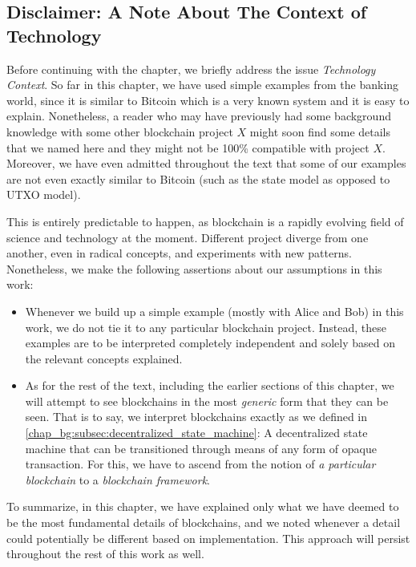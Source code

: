 \subsection{Disclaimer: A Note About The Context of Technology}

Before continuing with the chapter, we briefly address the issue \textit{Technology Context}. So far
in this chapter, we have used simple examples from the banking world, since it is similar to Bitcoin
which is a very known system and it is easy to explain. Nonetheless, a reader who may have
previously had some background knowledge with some other blockchain project $X$ might soon find some
details that we named here and they might not be 100\% compatible with project $X$. Moreover, we
have even admitted throughout the text that some of our examples are not even exactly similar to
Bitcoin (such as the state model as opposed to UTXO model).

This is entirely predictable to happen, as blockchain is a rapidly evolving field of
science and technology at the moment. Different project diverge from one another, even in radical
concepts, and experiments with new patterns. Nonetheless, we make the following assertions about our
assumptions in this work:

\begin{itemize}
	\item Whenever we build up a simple example (mostly with Alice and Bob) in this work, we do not
	tie it to any particular blockchain project. Instead, these examples are to be interpreted
	completely independent and solely based on the relevant concepts explained.
	\item As for the rest of the text, including the earlier sections of this chapter, we will
	attempt to see blockchains in the most \textit{generic} form that they can be seen. That is to
	say, we interpret blockchains exactly as we defined in
	\ref{chap_bg:subsec:decentralized_state_machine}: A decentralized state machine that can be
	transitioned through means of any form of opaque transaction. For this, we have to ascend from
	the notion of \textit{a particular blockchain} to a \textit{blockchain framework}.
\end{itemize}

To summarize, in this chapter, we have explained only what we have deemed to be the most fundamental
details of blockchains, and we noted whenever a detail could potentially be different based on
implementation. This approach will persist throughout the rest of this work as well.

